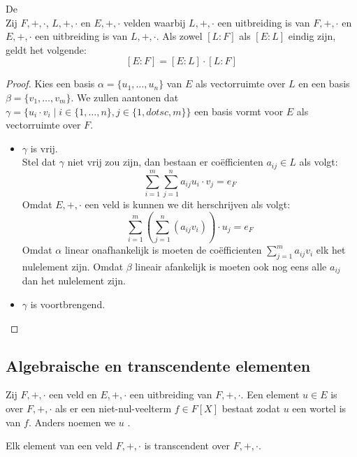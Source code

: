 \documentclass[main.tex]{subfiles}
\begin{document}
\begin{st}
  De \\
  Zij $F,+,\cdot$, $L,+,\cdot$ en $E,+,\cdot$ velden waarbij $L,+,\cdot$ een uitbreiding is van $F,+,\cdot$ en $E,+,\cdot$ een uitbreiding is van $L,+,\cdot$.
  Als zowel $[L:F]$ als $[E:L]$ eindig zijn, geldt het volgende:
  \[ [E:F] = [E:L] \cdot [L:F]\]

  \begin{proof}
    Kies een basis $\alpha = \{ u_{1},\dotsc,u_{n}\}$ van $E$ als vectorruimte over $L$ en een basis $\beta = \{ v_{1},\dotsc,v_{m}\}$.
    We zullen aantonen dat $\gamma = \{ u_{i}\cdot v_{i} \mid i\in \{1,\dotsc,n\}, j \in \{1,dotsc,m\} \}$ een basis vormt voor $E$ als vectorruimte over $F$.
  \begin{itemize}
  \item $\gamma$ is vrij.\\
    Stel dat $\gamma$ niet vrij zou zijn, dan bestaan er co\"efficienten $a_{ij}\in L$ als volgt:
    \[ \sum_{i=1}^{m}\sum_{j=1}^{n}a_{ij}u_{i}\cdot v_{j} = e_{F} \]
    Omdat $E,+,\cdot$ een veld is kunnen we dit herschrijven als volgt:
    \[ \sum_{i=1}^{m}\left(\sum_{j=1}^{n}(a_{ij}v_{i})\right)\cdot u_{j} = e_{F} \]
    Omdat $\alpha$ linear onafhankelijk is moeten de co\"efficienten $\sum_{j=1}^{m}a_{ij}v_{i}$ elk het nulelement zijn.
    Omdat $\beta$ lineair afankelijk is moeten ook nog eens alle $a_{ij}$ dan het nulelement zijn.
  \item $\gamma$ is voortbrengend.\\
  \end{itemize}
\end{proof}
\end{st}

\subsection{Algebraische en transcendente elementen}
\label{sec:algebr-en-transc}

\begin{de}
  Zij $F,+,\cdot$ een veld en $E,+,\cdot$ een uitbreiding van $F,+,\cdot$.
  Een element $u\in E$ is  over $F,+,\cdot$ als er een niet-nul-veelterm $f\in F[X]$ bestaat zodat $u$ een wortel is van $f$.
  Anders noemen we $u$ .
\end{de}

\begin{st}
  Elk element van een veld $F,+,\cdot$ is transcendent over $F,+,\cdot$.
\end{st}
\end{document}
